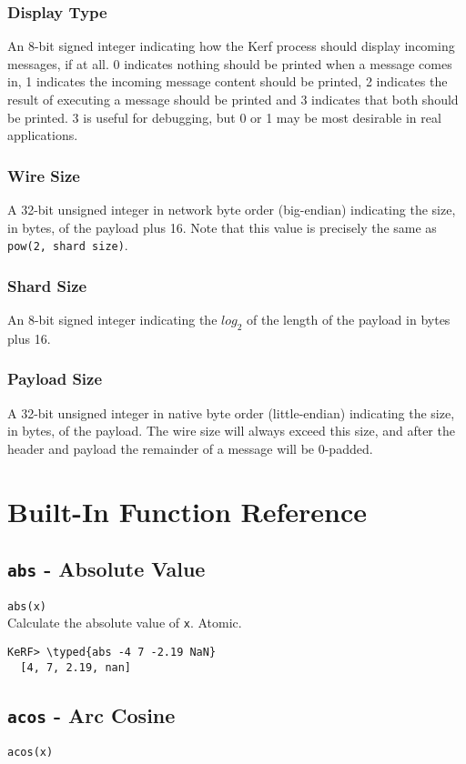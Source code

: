 \documentclass{article}
\newcommand{\typed}[1]{\textcolor{TealBlue}{#1}}
\newcommand{\primdefu}[3]{\subsection{\texttt{#1} - #2}\label{prim:#3}}
\newcommand{\primdef}[2]{\primdefu{#1}{#2}{#1}}
\begin{document}
\subsubsection{Display Type}
An 8-bit signed integer indicating how the Kerf process should display incoming messages, if at all. 0 indicates nothing should be printed when a message comes in, 1 indicates the incoming message content should be printed, 2 indicates the result of executing a message should be printed and 3 indicates that both should be printed. 3 is useful for debugging, but 0 or 1 may be most desirable in real applications.

\subsubsection{Wire Size}
A 32-bit unsigned integer in network byte order (big-endian) indicating the size, in bytes, of the payload plus 16. Note that this value is precisely the same as \texttt{pow(2, shard size)}.

\subsubsection{Shard Size}
An 8-bit signed integer indicating the $log_{2}$ of the length of the payload in bytes plus 16.

\subsubsection{Payload Size}
A 32-bit unsigned integer in native byte order (little-endian) indicating the size, in bytes, of the payload. The wire size will always exceed this size, and after the header and payload the remainder of a message will be 0-padded.

\pagebreak
\section {Built-In Function Reference}

\primdef{abs}{Absolute Value}
\texttt{abs(x)}\\

Calculate the absolute value of \texttt{x}. Atomic.
\begin{Verbatim}
KeRF> \typed{abs -4 7 -2.19 NaN}
  [4, 7, 2.19, nan]
\end{Verbatim}

\primdef{acos}{Arc Cosine}
\texttt{acos(x)}\\
\end{document}
